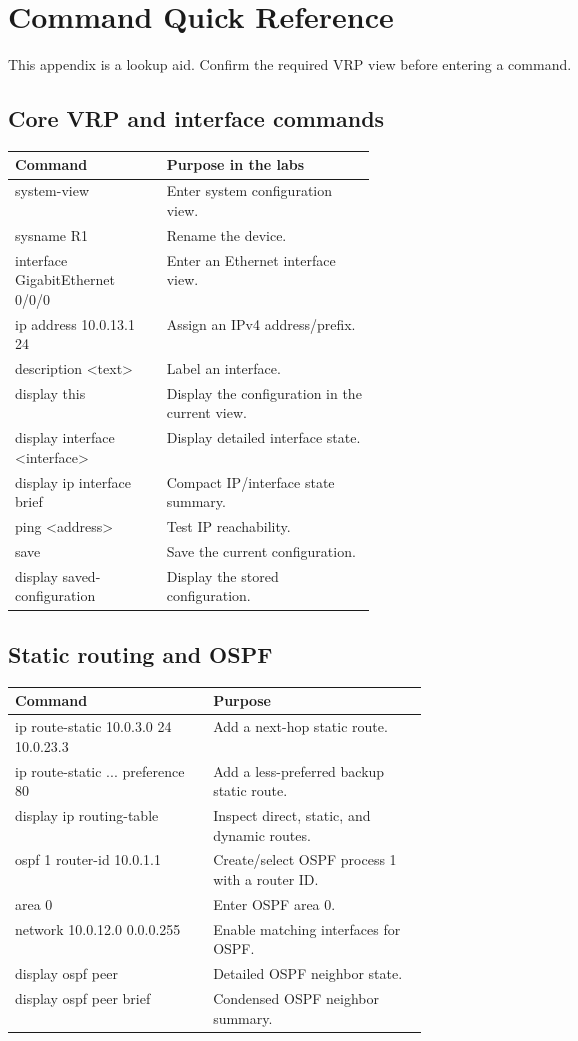 \chapter*{Command Quick Reference}
This appendix is a lookup aid. Confirm the required VRP view before entering a command.

\section*{Core VRP and interface commands}
\begin{tabularx}{\linewidth}{>{\ttfamily}p{0.42\linewidth}X}
\toprule
Command & Purpose in the labs\\\midrule
system-view & Enter system configuration view.\\
sysname R1 & Rename the device.\\
interface GigabitEthernet 0/0/0 & Enter an Ethernet interface view.\\
ip address 10.0.13.1 24 & Assign an IPv4 address/prefix.\\
description <text> & Label an interface.\\
display this & Display the configuration in the current view.\\
display interface <interface> & Display detailed interface state.\\
display ip interface brief & Compact IP/interface state summary.\\
ping <address> & Test IP reachability.\\
save & Save the current configuration.\\
display saved-configuration & Display the stored configuration.\\\bottomrule
\end{tabularx}

\section*{Static routing and OSPF}
\begin{tabularx}{\linewidth}{>{\ttfamily}p{0.48\linewidth}X}
\toprule
Command & Purpose\\\midrule
ip route-static 10.0.3.0 24 10.0.23.3 & Add a next-hop static route.\\
ip route-static ... preference 80 & Add a less-preferred backup static route.\\
display ip routing-table & Inspect direct, static, and dynamic routes.\\
ospf 1 router-id 10.0.1.1 & Create/select OSPF process 1 with a router ID.\\
area 0 & Enter OSPF area 0.\\
network 10.0.12.0 0.0.0.255 & Enable matching interfaces for OSPF.\\
display ospf peer & Detailed OSPF neighbor state.\\
display ospf peer brief & Condensed OSPF neighbor summary.\\\bottomrule
\end{tabularx}

